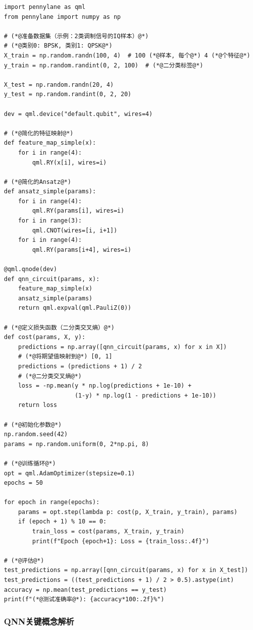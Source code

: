 \documentclass[11pt,a4paper]{article}
\begin{document}
\begin{lstlisting}[caption={QNN完整训练示例}]
import pennylane as qml
from pennylane import numpy as np

# (*@准备数据集（示例：2类调制信号的IQ样本）@*)
# (*@类别0: BPSK, 类别1: QPSK@*)
X_train = np.random.randn(100, 4)  # 100 (*@样本, 每个@*) 4 (*@个特征@*)
y_train = np.random.randint(0, 2, 100)  # (*@二分类标签@*)

X_test = np.random.randn(20, 4)
y_test = np.random.randint(0, 2, 20)

dev = qml.device("default.qubit", wires=4)

# (*@简化的特征映射@*)
def feature_map_simple(x):
    for i in range(4):
        qml.RY(x[i], wires=i)

# (*@简化的Ansatz@*)
def ansatz_simple(params):
    for i in range(4):
        qml.RY(params[i], wires=i)
    for i in range(3):
        qml.CNOT(wires=[i, i+1])
    for i in range(4):
        qml.RY(params[i+4], wires=i)

@qml.qnode(dev)
def qnn_circuit(params, x):
    feature_map_simple(x)
    ansatz_simple(params)
    return qml.expval(qml.PauliZ(0))

# (*@定义损失函数（二分类交叉熵）@*)
def cost(params, X, y):
    predictions = np.array([qnn_circuit(params, x) for x in X])
    # (*@将期望值映射到@*) [0, 1]
    predictions = (predictions + 1) / 2  
    # (*@二分类交叉熵@*)
    loss = -np.mean(y * np.log(predictions + 1e-10) + 
                    (1-y) * np.log(1 - predictions + 1e-10))
    return loss

# (*@初始化参数@*)
np.random.seed(42)
params = np.random.uniform(0, 2*np.pi, 8)

# (*@训练循环@*)
opt = qml.AdamOptimizer(stepsize=0.1)
epochs = 50

for epoch in range(epochs):
    params = opt.step(lambda p: cost(p, X_train, y_train), params)
    if (epoch + 1) % 10 == 0:
        train_loss = cost(params, X_train, y_train)
        print(f"Epoch {epoch+1}: Loss = {train_loss:.4f}")

# (*@评估@*)
test_predictions = np.array([qnn_circuit(params, x) for x in X_test])
test_predictions = ((test_predictions + 1) / 2 > 0.5).astype(int)
accuracy = np.mean(test_predictions == y_test)
print(f"(*@测试准确率@*): {accuracy*100:.2f}%")
\end{lstlisting}

\subsubsection{QNN关键概念解析}
\end{document}
